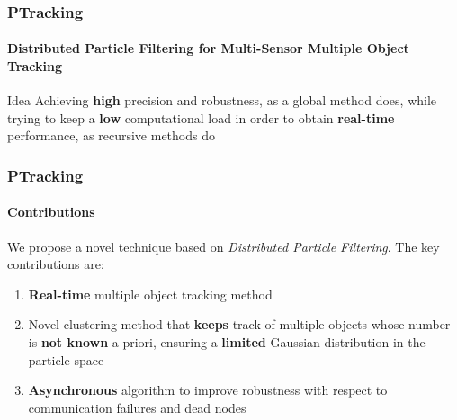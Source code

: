 \begin{frame}
	\frametitle{PTracking}
	\framesubtitle{Distributed Particle Filtering for Multi-Sensor Multiple Object Tracking}
	
	\LARGE
	
	\begin{block}{Idea}
		Achieving \textbf{high} precision and robustness, as a global method does, while trying to keep
		a \textbf{low} computational load in order to obtain \textbf{real-time} performance, as
		recursive methods do
	\end{block}
\end{frame}

\begin{frame}
	\frametitle{PTracking}
	\framesubtitle{Contributions}
	
	\Large
	
	\vspace{0.2cm}
	
	We propose a novel technique based on \emph{Distributed Particle Filtering}. The key contributions
	are:
	
	\vspace{0.15cm}
	
	\begin{enumerate}
		\item \textbf{Real-time} multiple object tracking method
		\item Novel clustering method that \textbf{keeps} track of multiple objects whose number is
			  \textbf{not known} a priori, ensuring a \textbf{limited} Gaussian distribution in the
			  particle space
		\item \textbf{Asynchronous} algorithm to improve robustness with respect to communication
			  failures and dead nodes
	\end{enumerate}
\end{frame}

